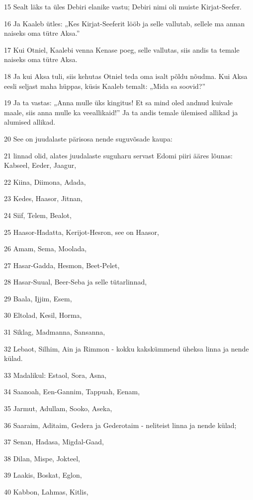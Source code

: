 \par 15 Sealt läks ta üles Debiri elanike vastu; Debiri nimi oli muiste Kirjat-Seefer.
\par 16 Ja Kaaleb ütles: „Kes Kirjat-Seeferit lööb ja selle vallutab, sellele ma annan naiseks oma tütre Aksa.”
\par 17 Kui Otniel, Kaalebi venna Kenase poeg, selle vallutas, siis andis ta temale naiseks oma tütre Aksa.
\par 18 Ja kui Aksa tuli, siis kehutas Otniel teda oma isalt põldu nõudma. Kui Aksa eesli seljast maha hüppas, küsis Kaaleb temalt: „Mida sa soovid?”
\par 19 Ja ta vastas: „Anna mulle üks kingitus! Et sa mind oled andnud kuivale maale, siis anna mulle ka veeallikaid!” Ja ta andis temale ülemised allikad ja alumised allikad.
\par 20 See on juudalaste pärisosa nende suguvõsade kaupa:
\par 21 linnad olid, alates juudalaste suguharu servast Edomi piiri ääres lõunas: Kabseel, Eeder, Jaagur,
\par 22 Kiina, Diimona, Adada,
\par 23 Kedes, Haasor, Jitnan,
\par 24 Siif, Telem, Bealot,
\par 25 Haasor-Hadatta, Kerijot-Hesron, see on Haasor,
\par 26 Amam, Sema, Moolada,
\par 27 Hasar-Gadda, Hesmon, Beet-Pelet,
\par 28 Hasar-Suual, Beer-Seba ja selle tütarlinnad,
\par 29 Baala, Ijjim, Esem,
\par 30 Eltolad, Kesil, Horma,
\par 31 Siklag, Madmanna, Sansanna,
\par 32 Lebaot, Silhim, Ain ja Rimmon - kokku kakskümmend üheksa linna ja nende külad.
\par 33 Madalikul: Estaol, Sora, Asna,
\par 34 Saanoah, Een-Gannim, Tappuah, Eenam,
\par 35 Jarmut, Adullam, Sooko, Aseka,
\par 36 Saaraim, Aditaim, Gedera ja Gederotaim - neliteist linna ja nende külad;
\par 37 Senan, Hadasa, Migdal-Gaad,
\par 38 Dilan, Mispe, Jokteel,
\par 39 Laakis, Boskat, Eglon,
\par 40 Kabbon, Lahmas, Kitlis,
